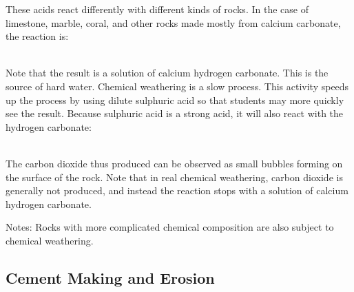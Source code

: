 \begin{multicols}{2}
\begin{description*}
{These acids react differently with different kinds of rocks. In the case of limestone, marble, coral, and other rocks made mostly from calcium carbonate, the reaction is:\\

\centering
{}\\	
\raggedright

Note that the result is a solution of calcium hydrogen carbonate. This is the source of hard water.
Chemical weathering is a slow process. This activity speeds up the process by using dilute sulphuric acid so that students may more quickly see the result. Because sulphuric acid is a strong acid, it will also react with the hydrogen carbonate:\\

\centering
{}\\	
\raggedright

The carbon dioxide thus produced can be observed as small bubbles forming on the surface of the rock. Note that in real chemical weathering, carbon dioxide is generally not produced, and instead the reaction stops with a solution of calcium hydrogen carbonate.}
\item[Notes:]{Rocks with more complicated chemical composition are also subject to chemical weathering.}
\end{description*}

\vfill
\columnbreak

\subsection{Cement Making and Erosion}



\end{multicols}
